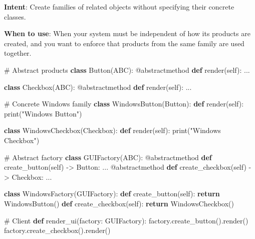 \documentclass[11pt]{article}
\newenvironment{Shaded}{\begin{snugshade}}{\end{snugshade}}
\newcommand{\AttributeTok}[1]{\textcolor[rgb]{0.16,0.50,0.73}{#1}}
\newcommand{\BuiltInTok}[1]{\textcolor[rgb]{0.50,0.55,0.55}{#1}}
\newcommand{\CommentTok}[1]{\textcolor[rgb]{0.48,0.49,0.49}{#1}}
\newcommand{\ControlFlowTok}[1]{\textcolor[rgb]{0.99,0.74,0.29}{\textbf{#1}}}
\newcommand{\KeywordTok}[1]{\textcolor[rgb]{0.81,0.81,0.76}{\textbf{#1}}}
\newcommand{\NormalTok}[1]{\textcolor[rgb]{0.81,0.81,0.76}{#1}}
\newcommand{\OperatorTok}[1]{\textcolor[rgb]{0.81,0.81,0.76}{#1}}
\newcommand{\StringTok}[1]{\textcolor[rgb]{0.96,0.31,0.31}{#1}}
\newcommand{\VariableTok}[1]{\textcolor[rgb]{0.15,0.68,0.68}{#1}}
\begin{document}
\textbf{Intent}: Create families of related objects without specifying their concrete classes.

\textbf{When to use}: When your system must be independent of how its products are created, and you want to enforce that products from the same family are used together.


\begin{Shaded}
\begin{Highlighting}[]
\CommentTok{\# Abstract products}
\KeywordTok{class}\NormalTok{ Button(ABC):}
    \AttributeTok{@abstractmethod}
    \KeywordTok{def}\NormalTok{ render(}\VariableTok{self}\NormalTok{): ...}

\KeywordTok{class}\NormalTok{ Checkbox(ABC):}
    \AttributeTok{@abstractmethod}
    \KeywordTok{def}\NormalTok{ render(}\VariableTok{self}\NormalTok{): ...}

\CommentTok{\# Concrete Windows family}
\KeywordTok{class}\NormalTok{ WindowsButton(Button):}
    \KeywordTok{def}\NormalTok{ render(}\VariableTok{self}\NormalTok{): }\BuiltInTok{print}\NormalTok{(}\StringTok{"Windows Button"}\NormalTok{)}

\KeywordTok{class}\NormalTok{ WindowsCheckbox(Checkbox):}
    \KeywordTok{def}\NormalTok{ render(}\VariableTok{self}\NormalTok{): }\BuiltInTok{print}\NormalTok{(}\StringTok{"Windows Checkbox"}\NormalTok{)}

\CommentTok{\# Abstract factory}
\KeywordTok{class}\NormalTok{ GUIFactory(ABC):}
    \AttributeTok{@abstractmethod}
    \KeywordTok{def}\NormalTok{ create\_button(}\VariableTok{self}\NormalTok{) }\OperatorTok{{-}\textgreater{}}\NormalTok{ Button: ...}
    \AttributeTok{@abstractmethod}
    \KeywordTok{def}\NormalTok{ create\_checkbox(}\VariableTok{self}\NormalTok{) }\OperatorTok{{-}\textgreater{}}\NormalTok{ Checkbox: ...}

\KeywordTok{class}\NormalTok{ WindowsFactory(GUIFactory):}
    \KeywordTok{def}\NormalTok{ create\_button(}\VariableTok{self}\NormalTok{): }\ControlFlowTok{return}\NormalTok{ WindowsButton()}
    \KeywordTok{def}\NormalTok{ create\_checkbox(}\VariableTok{self}\NormalTok{): }\ControlFlowTok{return}\NormalTok{ WindowsCheckbox()}

\CommentTok{\# Client}
\KeywordTok{def}\NormalTok{ render\_ui(factory: GUIFactory):}
\NormalTok{    factory.create\_button().render()}
\NormalTok{    factory.create\_checkbox().render()}
\end{Highlighting}
\end{Shaded}
\end{document}
